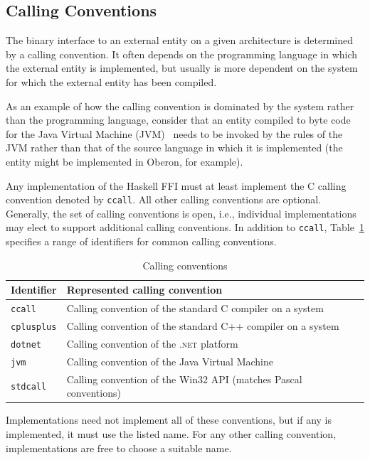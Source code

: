 \subsection{Calling Conventions}
\label{sec:call-conv}

The binary interface to an external entity on a given architecture is
determined by a calling convention.  It often depends on the programming
language in which the external entity is implemented, but usually is more
dependent on the system for which the external entity has been compiled.

As an example of how the calling convention is dominated by the system rather
than the programming language, consider that an entity compiled to byte code
for the Java Virtual Machine (JVM)~\cite{lindholm-etal:JVM} needs to be
invoked by the rules of the JVM rather than that of the source language in
which it is implemented (the entity might be implemented in Oberon, for
example).

Any implementation of the Haskell FFI must at least implement the C calling
convention denoted by \mbox{\tt ccall}.  All other calling conventions are
optional.  Generally, the set of calling conventions is open, i.e., individual
implementations may elect to support additional calling conventions.  In
addition to \mbox{\tt ccall}, Table~\ref{tab:callconv} specifies a range of
identifiers for common calling conventions.
%
\begin{table}[tbp]
  \begin{center}
    \begin{tabular}{|l|l|}
      \hline
      Identifier & Represented calling convention\\
      \hline\hline
      \mbox{\tt ccall} 
      & Calling convention of the standard C compiler on a system\\
      \mbox{\tt cplusplus}
      & Calling convention of the standard C{+}{+} compiler on a system\\
      \mbox{\tt dotnet}
      & Calling convention of the \textsc{.net} platform\\
      \mbox{\tt jvm} 
      & Calling convention of the Java Virtual Machine\\
      \mbox{\tt stdcall}
      & Calling convention of the Win32 API (matches Pascal conventions)\\
      \hline
    \end{tabular}
    \caption{Calling conventions}
    \label{tab:callconv}
  \end{center}
\end{table}
%
Implementations need not implement all of these conventions, but if any is
implemented, it must use the listed name.  For any other calling convention,
implementations are free to choose a suitable name.

